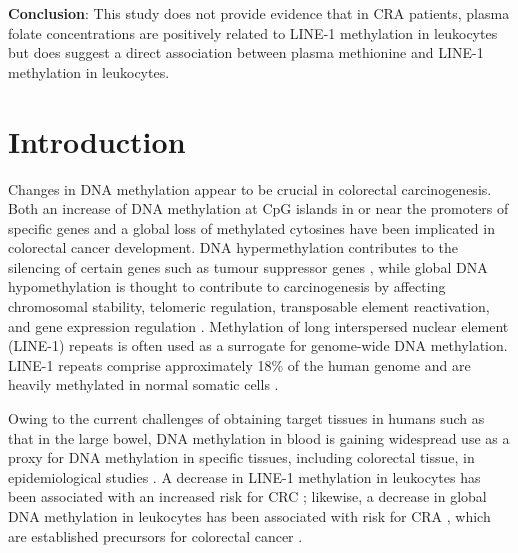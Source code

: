 \noindent \textbf{Conclusion}: This study does not provide evidence that in CRA patients, plasma folate concentrations are positively related to LINE-1 methylation in leukocytes but does suggest a direct association between plasma methionine and LINE-1 methylation in leukocytes.
 
\newpage 
 
\section{Introduction} %
\noindent Changes in DNA methylation appear to be crucial in colorectal carcinogenesis. Both an increase of DNA methylation at CpG islands in or near the promoters of specific genes \cite{c51,c52} and a global loss of methylated cytosines \cite{c53} have been implicated in colorectal cancer development. DNA hypermethylation contributes to the silencing of certain genes such as tumour suppressor genes \cite{c54}, while global DNA hypomethylation is thought to contribute to carcinogenesis by affecting chromosomal stability, telomeric regulation, transposable element reactivation, and gene expression regulation \cite{c55}. Methylation of long interspersed nuclear element (LINE-1) repeats is often used as a surrogate for genome-wide DNA methylation. LINE-1 repeats comprise approximately 18\% of the human genome and are heavily methylated in normal somatic cells \cite{c56}.

\noindent Owing to the current challenges of obtaining target tissues in humans such as that in the large bowel, DNA methylation in blood is gaining widespread use as a proxy for DNA methylation in specific tissues, including colorectal tissue, in epidemiological studies \cite{c57,c58,c59,c510}. A decrease in LINE-1 methylation in leukocytes has been associated with an increased risk for CRC \cite{c511}; likewise, a decrease in global DNA methylation in leukocytes has been associated with risk for CRA \cite{c57,c58}, which are established precursors for colorectal cancer \cite{c512,c513,c514}.

